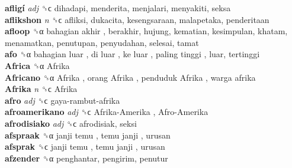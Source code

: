\textbf{afligí} \emph{adj}  ␝ϲ  dihadapi, menderita, menjalari, menyakiti, seksa  \\
\textbf{aflikshon} \emph{n}  ␝ϲ  afliksi, dukacita, kesengsaraan, malapetaka, penderitaan  \\
\textbf{afloop} ␝α   bahagian akhir , berakhir, hujung, kematian, kesimpulan, khatam, menamatkan, penutupan, penyudahan, selesai, tamat  \\
\textbf{afo} ␝α   bahagian luar ,  di luar ,  ke luar ,  paling tinggi , luar, tertinggi  \\
\textbf{Africa} ␝α   Afrika   \\
\textbf{Africano} ␝α   Afrika ,  orang Afrika ,  penduduk Afrika ,  warga afrika   \\
\textbf{Afrika} \emph{n}  ␝ϲ   Afrika   \\
\textbf{afro} \emph{adj}  ␝ϲ   gaya-rambut-afrika   \\
\textbf{afroamerikano} \emph{adj}  ␝ϲ   Afrika-Amerika ,  Afro-Amerika   \\
\textbf{afrodisiako} \emph{adj}  ␝ϲ  afrodisiak, seksi  \\
\textbf{afspraak} ␝α   janji temu ,  temu janji , urusan  \\
\textbf{afsprak} ␝ϲ   janji temu ,  temu janji , urusan  \\
\textbf{afzender} ␝α  penghantar, pengirim, penutur  \\
